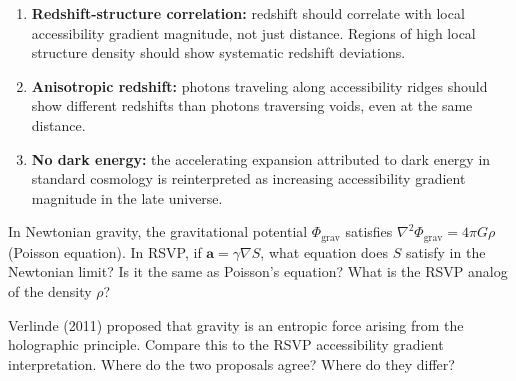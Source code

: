 \begin{enumerate}
  \item \textbf{Redshift-structure correlation:} redshift should correlate
        with local accessibility gradient magnitude, not just distance.
        Regions of high local structure density should show systematic
        redshift deviations.
  \item \textbf{Anisotropic redshift:} photons traveling along accessibility
        ridges should show different redshifts than photons traversing
        voids, even at the same distance.
  \item \textbf{No dark energy:} the accelerating expansion attributed
        to dark energy in standard cosmology is reinterpreted as
        increasing accessibility gradient magnitude in the late universe.
\end{enumerate}

\begin{exercise}
  In Newtonian gravity, the gravitational potential $\Phi_\text{grav}$
  satisfies $\nabla^2 \Phi_\text{grav} = 4\pi G \rho$
  (Poisson equation). In RSVP, if $\mathbf{a} = \gamma \nabla S$,
  what equation does $S$ satisfy in the Newtonian limit? Is it the
  same as Poisson's equation? What is the RSVP analog of the density $\rho$?
\end{exercise}

\begin{exercise}
  Verlinde (2011) proposed that gravity is an entropic force arising
  from the holographic principle. Compare this to the RSVP accessibility
  gradient interpretation. Where do the two proposals agree? Where do
  they differ?
\end{exercise}
